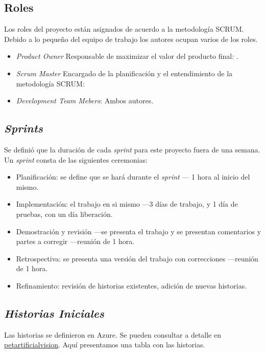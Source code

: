 \subsection{Roles}

Los roles del proyecto están asignados de acuerdo a la metodología SCRUM. Debido a lo pequeño del equipo de trabajo los autores ocupan varios de los roles.

\begin{itemize}
  \item \textit{Product Owner} Responsable de maximizar el valor del producto final: \atsecondauthor.
  \item \textit{Scrum Master} Encargado de la planificación y el entendimiento de la metodología SCRUM: \atfirstauthor
  \item \textit{Development Team Mebers}: Ambos autores.
\end{itemize}


\subsection{\textit{Sprints}}
\label{sec:sprints}

Se definió que la duración de cada \textit{sprint} para este proyecto fuera de una semana. Un \textit{sprint} consta de las siguientes ceremonias:


\begin{itemize}
  \item Planificación: se define que se hará durante el \textit{sprint} — 1 hora al inicio del mismo.
  \item Implementación: el trabajo en si mismo —3 días de trabajo, y 1 día de pruebas, con un día liberación.  
  \item Demostración y revisión —se presenta el trabajo y se presentan comentarios y partes a corregir —reunión de 1 hora.
  \item Retrospectiva: se presenta una versión del trabajo con correcciones —reunión de 1 hora. 
  \item Refinamiento: revisión de historias existentes, adición de nuevas historias.
\end{itemize}


\subsection{\textit{Historias Iniciales}}

Las historias se definieron en Azure. Se pueden consultar a detalle en \href{https://dev.azure.com/petartificialvision}{petartificialvision}. Aquí presentamos una tabla con las historias.

